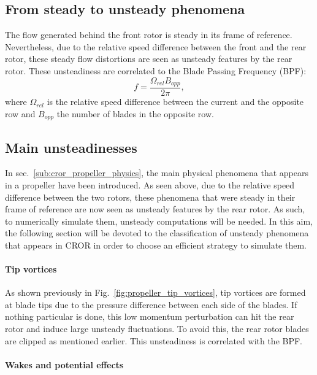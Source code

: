 
\subsection{From steady to unsteady phenomena}
\label{sub:cror_from_steady_to_unsteady_phenomena}

The flow generated behind the front rotor
is steady in its frame of reference. Nevertheless,
due to the relative speed difference between the
front and the rear rotor, these steady flow distortions are
seen as unsteady features by the rear rotor. 
These unsteadiness are correlated to the Blade Passing Frequency (BPF):
\begin{equation}
	f = \frac{\Omega_{rel} B_{opp}}{2 \pi},
\end{equation}
where $\Omega_{rel}$ is the relative speed difference between
the current and the opposite row
and $B_{opp}$ the number of blades in the opposite row.

\subsection{Main unsteadinesses}
\label{sub:cror_main_unsteadinesses}

In sec.~\ref{sub:cror_propeller_physics}, the main physical phenomena
that appears in a propeller have been introduced. As seen above, due to
the relative speed difference between the two rotors, these phenomena
that were steady in their frame of reference are now seen as unsteady features
by the rear rotor. As such, to numerically simulate them, unsteady computations
will be needed. In this aim, the following section will be devoted to the classification
of unsteady phenomena that appears in CROR in 
order to choose an efficient strategy to simulate them.

\paragraph{Tip vortices}

As shown previously in Fig.~\ref{fig:propeller_tip_vortices}, tip vortices are formed
at blade tips due to the pressure difference between each side of the blades.
If nothing particular is done, this low momentum perturbation can
hit the rear rotor and induce large unsteady fluctuations. To avoid this,
the rear rotor blades are clipped as mentioned earlier. 
This unsteadiness is correlated with the BPF.

\paragraph{Wakes and potential effects}

